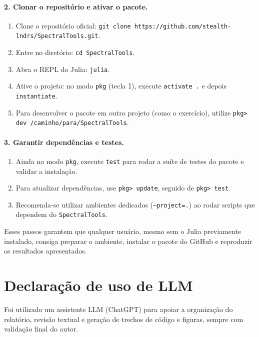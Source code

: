 \documentclass[12pt,a4paper]{article}
\begin{document}
\paragraph{2. Clonar o repositório e ativar o pacote.}
\begin{enumerate}
    \item Clone o repositório oficial:
    \texttt{git clone https://github.com/stealth-lndrs/SpectralTools.git}.
    \item Entre no diretório: \texttt{cd SpectralTools}.
    \item Abra o REPL do Julia: \texttt{julia}.
    \item Ative o projeto: no modo \texttt{pkg} (tecla \texttt{]}), execute
    \texttt{activate .} e depois \texttt{instantiate}.
    \item Para desenvolver o pacote em outro projeto (como o exercício),
    utilize \texttt{pkg> dev /caminho/para/SpectralTools}.
\end{enumerate}

\paragraph{3. Garantir dependências e testes.}
\begin{enumerate}
    \item Ainda no modo \texttt{pkg}, execute \texttt{test} para rodar a suíte
    de testes do pacote e validar a instalação.
    \item Para atualizar dependências, use \texttt{pkg> update}, seguido de
    \texttt{pkg> test}.
    \item Recomenda-se utilizar ambientes dedicados (\texttt{--project=.}) ao
    rodar scripts que dependem do \texttt{SpectralTools}.
\end{enumerate}

Esses passos garantem que qualquer usuário, mesmo sem o Julia previamente
instalado, consiga preparar o ambiente, instalar o pacote do GitHub e
reproduzir os resultados apresentados.


\section{Declaração de uso de LLM}
Foi utilizado um assistente LLM (ChatGPT) para apoiar a organização do relatório, revisão textual e geração de trechos de código e figuras, sempre com validação final do autor.
\end{document}

